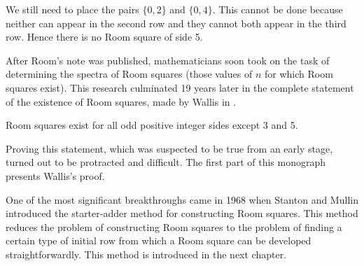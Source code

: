 We still need to place the pairs $\{0, 2\}$ and $\{0, 4\}$.
This cannot be done because neither can appear in the second row and they cannot both appear in the third row.
Hence there is no Room square of side 5.

After Room's note was published, mathematicians soon took on the task of determining the spectra of Room squares (those values of $n$ for which Room squares exist).
This research culminated 19 years later in the complete statement of the existence of Room squares, made by Wallis in \cite{wallisSolutionRoomSquare1974}.

\begin{theorem}
\label{thm:main}
Room squares exist for all odd positive integer sides except 3 and 5.
\end{theorem}

Proving this statement, which was suspected to be true from an early stage, turned out to be protracted and difficult.
The first part of this monograph presents Wallis's proof.

One of the most significant breakthroughs came in 1968 when Stanton and Mullin introduced the starter-adder method for constructing Room squares.
This method reduces the problem of constructing Room squares to the problem of finding a certain type of initial row from which a Room square can be developed straightforwardly.
This method is introduced in the next chapter.

